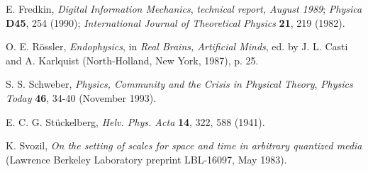 \documentclass[pra,amsfonts, twocolumn]{revtex4}
\begin{document}
\begin{thebibliography}{99}
%
%
 E. Fredkin,
 {\sl Digital Information Mechanics}, {\it technical report, August
1989};
 {\sl Physica} {\bf D45}, 254 (1990);
{\sl International Journal of Theoretical Physics} {\bf
21}, 219 (1982).

%
%
%
%
%
%
%

 O. E. R\"ossler,
{\sl Endophysics}, in {\sl Real Brains, Artificial
 Minds}, ed. by J. L. Casti and A. Karlquist (North-Holland, New
 York, 1987), p. 25.

%

S. S. Schweber,
{\it Physics, Community and the Crisis in Physical Theory},
{\sl Physics Today} {\bf 46}, 34-40 (November 1993).


E. C. G. St\"uckelberg, {\sl Helv. Phys. Acta} {\bf 14}, 322, 588
(1941).


 K. Svozil,
 {\sl On the setting of scales for space and time in arbitrary
 quantized media}  (Lawrence Berkeley Laboratory preprint
 LBL-16097, May 1983).



\end{thebibliography}
\end{document}
